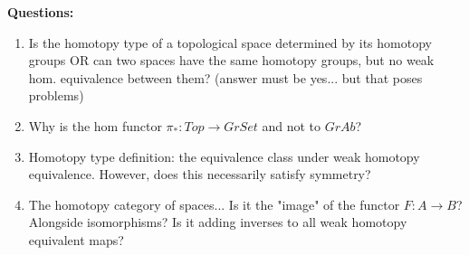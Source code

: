 \textbf{Questions:}
\begin{enumerate}
    \item Is the homotopy type of a topological space determined by its homotopy groups OR can two spaces have the same homotopy groups, but no weak hom. equivalence between them? (answer must be yes... but that poses problems)
    \item Why is the hom functor $\pi_*:Top\rightarrow GrSet$ and not to $GrAb$?
    \item Homotopy type definition: the equivalence class under weak homotopy equivalence. However, does this necessarily satisfy symmetry?
    \item The homotopy category of spaces... Is it the "image" of the functor $F:A\rightarrow B$? Alongside isomorphisms? Is it adding inverses to all weak homotopy equivalent maps?
\end{enumerate}